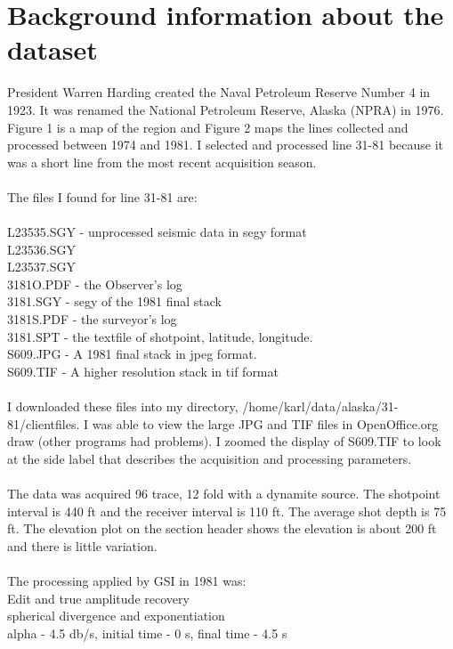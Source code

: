 \section{Background information about the dataset}
President Warren Harding created the Naval Petroleum Reserve Number 4 in 1923.  It was renamed the National Petroleum Reserve, Alaska (NPRA) in 1976.  Figure 1 is a  map of the region and Figure 2 maps the lines collected and processed between 1974 and 1981.  I selected and processed line 31-81 because it was a short line from the most recent acquisition season.\\
\\
The files I found for line 31-81 are: \\
\\
L23535.SGY - unprocessed seismic data in segy format\\
L23536.SGY\\
L23537.SGY\\
3181O.PDF - the Observer's log\\
3181.SGY - segy of the 1981 final stack\\
3181S.PDF - the surveyor's log\\
3181.SPT - the textfile of shotpoint, latitude, longitude. \\
S609.JPG  - A 1981 final stack in jpeg format.\\
S609.TIF  - A higher resolution stack in tif format\\
\\
I downloaded these files into my directory,  /home/karl/data/alaska/31-81/clientfiles.  I was able to view the large JPG and TIF files in OpenOffice.org draw (other programs had problems).  I zoomed the display of S609.TIF to look at the side label that describes the acquisition and processing parameters.\\
\\   
The data was acquired 96 trace, 12 fold with a dynamite source.  The shotpoint interval is 440 ft and the receiver interval is 110 ft.  The average shot depth is 75 ft.  The elevation plot on the section header shows the elevation is about 200 ft and there is little variation.\\
\\
The processing applied by GSI in 1981 was:\\
Edit and true amplitude recovery\\
spherical divergence and exponentiation\\
alpha - 4.5 db/s, initial time - 0 s, final time - 4.5 s\\
